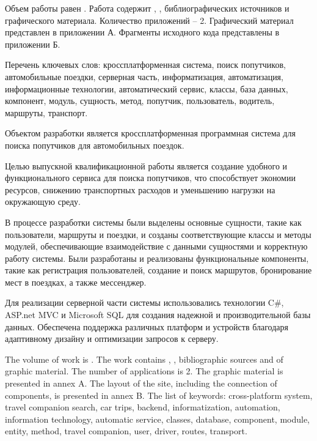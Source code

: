 
Объем работы равен . Работа содержит , ,  библиографических источников и  графического материала. Количество приложений – 2. Графический материал представлен в приложении А. Фрагменты исходного кода представлены в приложении Б.

Перечень ключевых слов: кроссплатформенная система, поиск попутчиков, автомобильные поездки, серверная часть, информатизация, автоматизация, информационные технологии, автоматический сервис, классы, база данных, компонент, модуль, сущность, метод, попутчик, пользователь, водитель, маршруты, транспорт.

Объектом разработки является кроссплатформенная программная система для поиска попутчиков для автомобильных поездок.

Целью выпускной квалификационной работы является создание удобного и функционального сервиса для поиска попутчиков, что способствует экономии ресурсов, снижению транспортных расходов и уменьшению нагрузки на окружающую среду.

В процессе разработки системы были выделены основные сущности, такие как пользователи, маршруты и поездки, и созданы соответствующие классы и методы модулей, обеспечивающие взаимодействие с данными сущностями и корректную работу системы. Были разработаны и реализованы функциональные компоненты, такие как регистрация пользователей, создание и поиск маршрутов, бронирование мест в поездках, а также мессенджер.

Для реализации серверной части системы использовались технологии C\#, ASP.net MVC и Microsoft SQL для создания надежной и производительной базы данных. Обеспечена поддержка различных платформ и устройств благодаря адаптивному дизайну и оптимизации запросов к серверу.

  
The volume of work is . The work contains , ,  bibliographic sources and  of graphic material. The number of applications is 2. The graphic material is presented in annex A. The layout of the site, including the connection of components, is presented in annex B.
The list of keywords: cross-platform system, travel companion search, car trips, backend, informatization, automation, information technology, automatic service, classes, database, component, module, entity, method, travel companion, user, driver, routes, transport.

